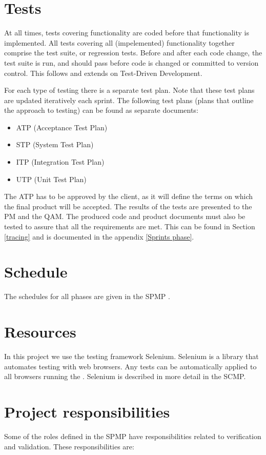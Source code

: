 \section{Tests}
At all times, tests covering functionality are coded before that functionality is implemented. 
All tests covering all (impelemented) functionality together comprise the test suite, or regression tests.
Before and after each code change, the test suite is run, and should pass before code is changed or committed to version control. This follows and extends on Test-Driven Development.

 For each type of testing there is a separate test plan. 
Note that these test plans are updated iteratively each sprint. The following test plans (plans that outline the approach to testing) can be found as separate documents:

\begin{itemize}
\item ATP (Acceptance Test Plan) \cite{atp}
\item STP (System Test Plan) \cite{stp}
\item ITP (Integration Test Plan) \cite{itp}
\item UTP (Unit Test Plan) \cite{utp}
\end{itemize}

The ATP \cite{atp} has to be approved by the client, as it will define the terms on which the final product will be accepted. The results of the tests are presented to the PM and the QAM. The produced code and product documents must also be tested to assure that all the requirements are met. This can be found in Section \ref{tracing} and is documented in the appendix \ref{Sprints phase}.

\section{Schedule}
The schedules for all phases are given in the SPMP \cite{spmp}.

\section{Resources}
In this project we use the testing framework Selenium. Selenium is a library that automates testing with web browsers. Any tests can be automatically applied to all browsers running the  \applicationname{}. Selenium is described in more detail in the SCMP\cite{scmp}.

\section{Project responsibilities}
    Some of the roles defined in the SPMP have responsibilities related to verification and validation.
    These responsibilities are:\\

